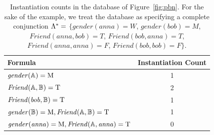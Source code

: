 \documentclass[runningheads,a4paper]{llncs}
\begin{document}
\begin{table}[htdp]
\caption{Instantiation counts in the database of Figure~\ref{fig:pbn}. For the sake of the example, we treat the database as specifying a complete conjunction $\Lambda^{*}\hspace{0.0ex} =$  $\{gender(anna) = W$,  $gender(bob) = M$, $Friend(anna,bob) = T$, $Friend(bob,anna) = T$, $Friend(anna,anna) = F$, $Friend(bob,bob) = F
\}$.}
\begin{center}
\begin{tabular}{lc}
Formula & Instantiation Count\\\hline
$\it{gender}(\mathbb{A}) = \mathrm{M}$ & 1 \\
$\it{Friend}(\mathbb{A},\mathbb{B}) = \mathrm{T}$ & 2\\
$\it{Friend}(bob,\mathbb{B}) = \mathrm{T}$ & 1 \\
$\it{gender}(\mathbb{B}) = \mathrm{M}, \it{Friend}(\mathbb{A},\mathbb{B}) = \mathrm{T}$ & 1 \\
$\it{gender}(anna) = \mathrm{M}, \it{Friend}(\mathbb{A}, anna) = \mathrm{T}$ & 0
\end{tabular}
\end{center}
\label{table:count-examples}
\end{table}%
\end{document}
